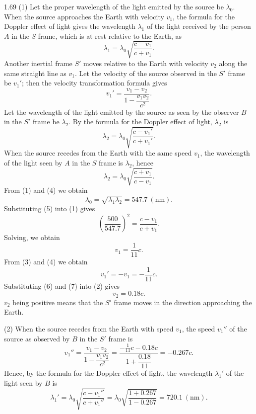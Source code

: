 \begin{solution}{1.69}
(1) Let the proper wavelength of the light emitted by the source be $\lambda_0$. When the source approaches the Earth with velocity $v_1$, the formula for the Doppler effect of light gives the wavelength $\lambda_1$ of the light received by the person $A$ in the $S$ frame, which is at rest relative to the Earth, as
\begin{equation}
\lambda_1=\lambda_0\sqrt{\frac{c-v_1}{c+v_1}}. \tag{1}
\end{equation}
Another inertial frame $S'$ moves relative to the Earth with velocity $v_2$ along the same straight line as $v_1$. Let the velocity of the source observed in the $S'$ frame be $v_1'$; then the velocity transformation formula gives
\begin{equation}
v_1'=\frac{v_1-v_2}{1-\dfrac{v_1v_2}{c^2}}. \tag{2}
\end{equation}
Let the wavelength of the light emitted by the source as seen by the observer $B$ in the $S'$ frame be $\lambda_2$. By the formula for the Doppler effect of light, $\lambda_2$ is
\begin{equation}
\lambda_2=\lambda_0\sqrt{\frac{c-v_1'}{c+v_1'}}. \tag{3}
\end{equation}
When the source recedes from the Earth with the same speed $v_1$, the wavelength of the light seen by $A$ in the $S$ frame is $\lambda_2$, hence
\begin{equation}
\lambda_2=\lambda_0\sqrt{\frac{c+v_1}{c-v_1}}. \tag{4}
\end{equation}
From (1) and (4) we obtain
\begin{equation}
\lambda_0=\sqrt{\lambda_1\lambda_2}=547.7\ (\mathrm{nm}). \tag{5}
\end{equation}
Substituting (5) into (1) gives
\[
\left(\frac{500}{547.7}\right)^2=\frac{c-v_1}{c+v_1}.
\]
Solving, we obtain
\begin{equation}
v_1=\frac{1}{11}c. \tag{6}
\end{equation}
From (3) and (4) we obtain
\begin{equation}
v_1'=-v_1=-\frac{1}{11}c. \tag{7}
\end{equation}
Substituting (6) and (7) into (2) gives
\[
v_2=0.18c.
\]
$v_2$ being positive means that the $S'$ frame moves in the direction approaching the Earth.

(2) When the source recedes from the Earth with speed $v_1$, the speed $v_1''$ of the source as observed by $B$ in the $S'$ frame is
\[
v_1''=\frac{v_1-v_2}{1-\dfrac{v_1v_2}{c^2}}
=\frac{-\frac{1}{11}c-0.18c}{1+\dfrac{0.18}{11}}=-0.267c.
\]
Hence, by the formula for the Doppler effect of light, the wavelength $\lambda_1'$ of the light seen by $B$ is
\[
\lambda_1'=\lambda_0\sqrt{\frac{c-v_1''}{c+v_1''}}
=\lambda_0\sqrt{\frac{1+0.267}{1-0.267}}=720.1\ (\mathrm{nm}).
\]
\end{solution}

